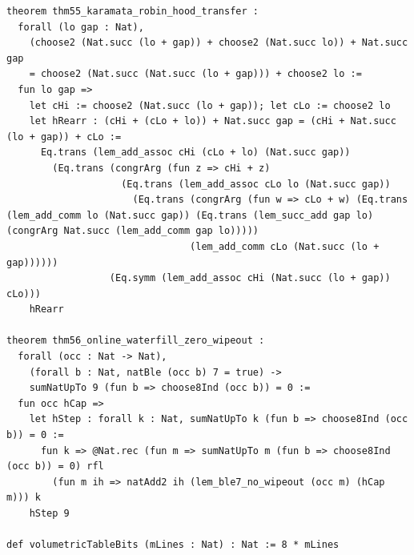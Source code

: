\documentclass[11pt,letterpaper]{article}
\theoremstyle{spectralthm}
\begin{document}
\begin{lstlisting}[language=Lean4,caption={Standalone Pure Init.Prelude Term-Mode Lean 4 Kernel Suite (thm30--thm61, v0.0.0, 0 sorry, 0 axioms).},label={lst:lean_unified}]
theorem thm55_karamata_robin_hood_transfer :
  forall (lo gap : Nat),
    (choose2 (Nat.succ (lo + gap)) + choose2 (Nat.succ lo)) + Nat.succ gap
    = choose2 (Nat.succ (Nat.succ (lo + gap))) + choose2 lo :=
  fun lo gap =>
    let cHi := choose2 (Nat.succ (lo + gap)); let cLo := choose2 lo
    let hRearr : (cHi + (cLo + lo)) + Nat.succ gap = (cHi + Nat.succ (lo + gap)) + cLo :=
      Eq.trans (lem_add_assoc cHi (cLo + lo) (Nat.succ gap))
        (Eq.trans (congrArg (fun z => cHi + z)
                    (Eq.trans (lem_add_assoc cLo lo (Nat.succ gap))
                      (Eq.trans (congrArg (fun w => cLo + w) (Eq.trans (lem_add_comm lo (Nat.succ gap)) (Eq.trans (lem_succ_add gap lo) (congrArg Nat.succ (lem_add_comm gap lo)))))
                                (lem_add_comm cLo (Nat.succ (lo + gap))))))
                  (Eq.symm (lem_add_assoc cHi (Nat.succ (lo + gap)) cLo)))
    hRearr

theorem thm56_online_waterfill_zero_wipeout :
  forall (occ : Nat -> Nat),
    (forall b : Nat, natBle (occ b) 7 = true) ->
    sumNatUpTo 9 (fun b => choose8Ind (occ b)) = 0 :=
  fun occ hCap =>
    let hStep : forall k : Nat, sumNatUpTo k (fun b => choose8Ind (occ b)) = 0 :=
      fun k => @Nat.rec (fun m => sumNatUpTo m (fun b => choose8Ind (occ b)) = 0) rfl
        (fun m ih => natAdd2 ih (lem_ble7_no_wipeout (occ m) (hCap m))) k
    hStep 9

def volumetricTableBits (mLines : Nat) : Nat := 8 * mLines


\end{lstlisting}
\end{document}
